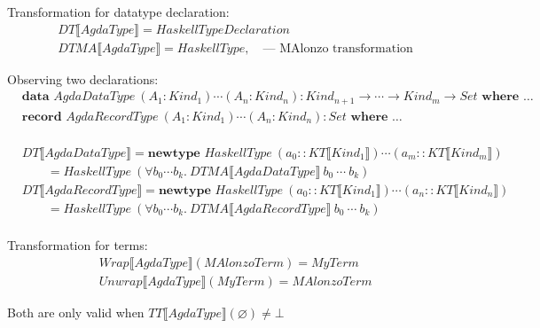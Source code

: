 Transformation for datatype declaration:
\begin{align*}
   &DT\llbracket AgdaType \rrbracket = HaskellTypeDeclaration\\
   &DTMA\llbracket AgdaType \rrbracket = HaskellType,
      \quad \text{--- MAlonzo transformation}
\end{align*}

Observing two declarations:
\begin{align*}
   &\textbf{data } AgdaDataType\ (A_1 : Kind_1) \cdots (A_n : Kind_n) :
      Kind_{n+1} \rightarrow \cdots \rightarrow Kind_{m} \rightarrow Set \textbf{ where } \ldots\\
   &\textbf{record } AgdaRecordType\ (A_1 : Kind_1) \cdots (A_n : Kind_n) :
      Set \textbf{ where } \ldots\\
\end{align*}

\begin{align*}
   &DT\llbracket AgdaDataType \rrbracket = \textbf{newtype } HaskellType\ (a_0 :: KT\llbracket Kind_1 \rrbracket)
      \cdots (a_m :: KT\llbracket Kind_m \rrbracket)\\
   &\quad\quad = HaskellType\ (\forall b_0 \cdots b_k.\ DTMA\llbracket AgdaDataType \rrbracket\ b_0\ \cdots\ b_k)\\
   &DT\llbracket AgdaRecordType \rrbracket = \textbf{newtype } HaskellType\ (a_0 :: KT\llbracket Kind_1 \rrbracket)
      \cdots (a_n :: KT\llbracket Kind_n \rrbracket)\\
   &\quad\quad = HaskellType\ (\forall b_0 \cdots b_k.\ DTMA\llbracket AgdaRecordType \rrbracket\ b_0\ \cdots\ b_k)\\
\end{align*}

Transformation for terms:
\begin{align*}
   &Wrap\llbracket AgdaType \rrbracket(MAlonzoTerm) = MyTerm\\
   &Unwrap\llbracket AgdaType \rrbracket(MyTerm) = MAlonzoTerm
\end{align*}

Both are only valid when \(TT\llbracket AgdaType \rrbracket(\varnothing) \neq \bot\)

